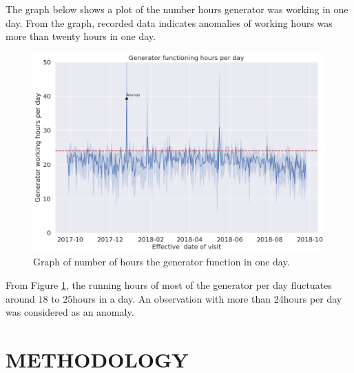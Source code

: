 \documentclass[final,5p,times,twocolumn,authoryear]{elsarticle}
\begin{document}
The graph below shows a plot of the number hours generator was working in one day. From the graph, recorded data indicates anomalies of working hours was more than twenty hours in one day.\\

\begin{figure}[H]
	\centering
	\includegraphics[width=1.0\linewidth]{"Figures/Generator_Working hours_per_graph"}
	\caption{Graph of number of hours the generator function in one day.}
 \label{fig:rr}
\end{figure}

From Figure    \ref{fig:rr}, the running hours of most of the generator per day fluctuates around $18$ to $25$hours in a day. An observation with more than 24hours per day was considered as an anomaly.

\section{METHODOLOGY} \label{sec:med}
\end{document}
